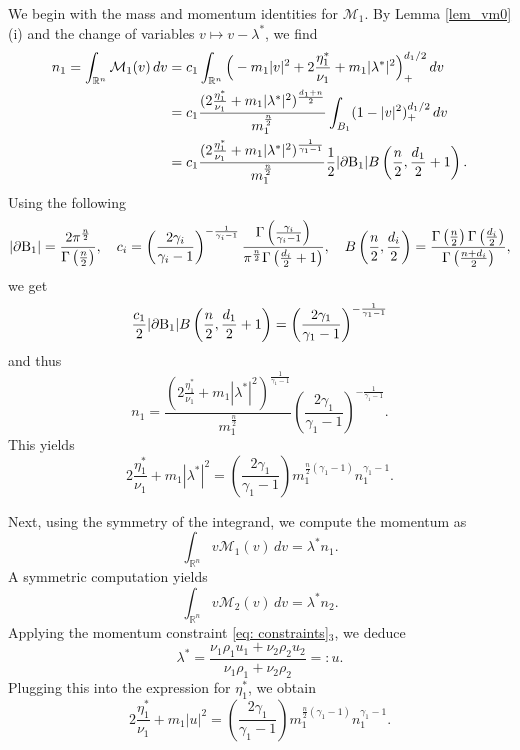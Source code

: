\documentclass[10pt,reqno]{amsart}
\numberwithin{equation}{section}
\newcommand{\R}{\mathbb R}
\newcommand{\bq}{\begin{equation}}
\newcommand{\eq}{\end{equation}}
\newcommand{\lt}{\left}
\newcommand{\rt}{\right}
\newcommand{\pa}{\partial}
\begin{document}
We begin with the mass and momentum identities for $\mathcal{M}_1$. By Lemma \ref{lem_vm0} (i) and the change of variables $v \mapsto v -  \lambda^*$, we find
\[%
\begin{split}
    n_1 = \int_{\R^n} \mathcal M_1(v) \,dv     &=c_1 \int_{\R^n}  \Big(- m_1 |v|^2 + 2\frac{\eta_1^*}{\nu_1} + m_1  | \lambda^*|^2 \Big)^{d_1/2}_+ \, dv \\
     &= c_1 \frac{( 2\frac{\eta_1^*}{\nu_1} + m_1 | \lambda^*|^2)^{\frac{d_1 + n}2}}{m_1^{\frac n2}} \int_{B_1}  (1 - |v|^2)^{d_1/2}_+ \, dv \\
     &= c_1 \frac{( 2\frac{\eta_1^*}{\nu_1} + m_1 | \lambda^*|^2)^{\frac1{\gamma_1 - 1}}}{m_1^{\frac n2}} \frac12 |\pa {\rm B}_1| B\lt( \frac n2, \frac{d_1}2 +1 \rt). 
    \end{split}
\]%
Using the following 
\[
|\pa {\rm B}_1| = \frac{2\pi^{\frac{n}{2}}}{\Gamma\left(\frac{n}{2}\right)}, \quad
c_i = \left( \frac{2\gamma_i}{\gamma_i - 1} \right)^{-\frac{1}{\gamma_i - 1}} \frac{\Gamma\left( \frac{\gamma_i}{\gamma_i - 1} \right)}{\pi^{\frac{n}{2}} \Gamma\left( \frac{d_i}{2} + 1 \right)}, \quad B\left( \frac{n}{2}, \frac{d_i}{2} \right) = \frac{\Gamma\left(\frac{n}{2}\right)\Gamma\left(\frac{d_i}{2}\right)}{\Gamma\left(\frac{n + d_i}{2}\right)},
\]
we get
\[
\frac{c_1}2 |\pa {\rm B}_1| B\lt( \frac n2, \frac{d_1}2 +1 \rt) = \left( \frac{2\gamma_1}{\gamma_1 - 1} \right)^{-\frac{1}{\gamma_1 - 1}}
\]
and thus
\[
    n_1 = \frac{( 2\frac{\eta_1^*}{\nu_1} + m_1 | \lambda^*|^2)^{\frac1{\gamma_1 - 1}}}{m_1^{\frac n2}} \left( \frac{2\gamma_1}{\gamma_1 - 1} \right)^{-\frac{1}{\gamma_1 - 1}}.
\]
This yields
\[
2\frac{\eta_1^*}{\nu_1} + m_1 | \lambda^*|^2 = \left( \frac{2\gamma_1}{\gamma_1 - 1} \right) m_1^{\frac n2 (\gamma_1 - 1)} n_1^{\gamma_1 - 1}.
\]

Next, using the symmetry of the integrand, we compute the momentum as
\bq\label{eq: calc vM1}
\int_{\mathbb{R}^n} v \mathcal{M}_1(v)\, dv =  \lambda^* n_1.
\eq
A symmetric computation yields
\[
\int_{\mathbb{R}^n} v \mathcal{M}_2(v)\, dv =   \lambda^* n_2.
\]
Applying the momentum constraint \eqref{eq: constraints}$_3$, we deduce
\bq\label{eq: lambda*}
\lambda^* = \frac{ \nu_1 \rho_1 u_1 +  \nu_2 \rho_2 u_2}{\nu_1 \rho_1 +  \nu_2 \rho_2} =: u.
\eq
Plugging this into the expression for $\eta_1^*$, we obtain
\[%
2\frac{\eta_1^*}{\nu_1} + m_1 |u|^2 =  \left( \frac{2\gamma_1}{\gamma_1 - 1} \right) m_1^{\frac n2 (\gamma_1 - 1)} n_1^{\gamma_1 - 1}.
\]%
\end{document}

